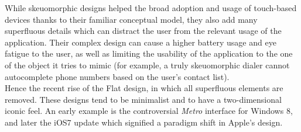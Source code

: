 \documentclass[a4paper,11pt] {article}
\theoremstyle{definition}
\begin{document}
        While skeuomorphic designs helped the broad adoption and usage of touch-based devices thanks to their familiar conceptual model, they also add many superfluous details which can distract the user from the relevant usage of the application. Their complex design can cause a higher battery usage and eye fatigue to the user, as well as limiting the usability of the application to the one of the object it tries to mimic (for example, a truly skeuomorphic dialer cannot autocomplete phone numbers based on the user's contact list).\\

        Hence the recent rise of the Flat design, in which all superfluous elements are removed. These designs tend to be minimalist and to have a two-dimensional iconic feel. An early example is the controversial \textit{Metro} interface for Windows 8, and later the iOS7 update which signified a paradigm shift in Apple's design.
 \begin{figure}[H]
    \centering
    \
    \end{figure}
\end{document}
